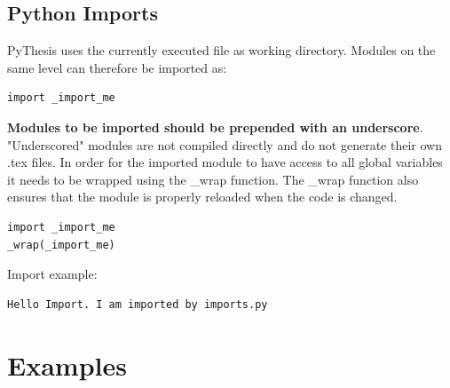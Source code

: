 \documentclass[a4paper]{book}
\begin{document}
\section{Python Imports}
\label{sec:python-imports}
PyThesis uses the currently executed file as working directory. Modules on the same level can therefore be imported as:
\begin{verbatim}
import _import_me
\end{verbatim}
\textbf{Modules to be imported should be prepended with an underscore}. "Underscored" modules are not compiled directly and do not generate their own .tex files. In order for the imported module to have access to all global variables it needs to be wrapped using the \_wrap function. The \_wrap function also ensures that the module is properly reloaded when the code is changed.
\begin{verbatim}
import _import_me
_wrap(_import_me)
\end{verbatim}
Import example:
\begin{verbatim}
Hello Import. I am imported by imports.py
\end{verbatim}
\chapter{Examples}
\label{ch:examples}
\end{document}
